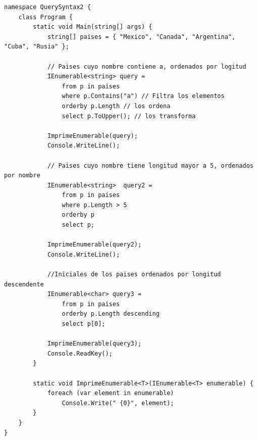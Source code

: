 \documentclass[12pt,a4paper]{report}
\begin{document}
\begin{lstlisting}
namespace QuerySyntax2 {
    class Program {
        static void Main(string[] args) {
            string[] paises = { "Mexico", "Canada", "Argentina", "Cuba", "Rusia" };

            // Paises cuyo nombre contiene a, ordenados por logitud
            IEnumerable<string> query =
                from p in paises
                where p.Contains("a") // Filtra los elementos
                orderby p.Length // los ordena 
                select p.ToUpper(); // los transforma

            ImprimeEnumerable(query);
            Console.WriteLine();

            // Paises cuyo nombre tiene longitud mayor a 5, ordenados por nombre
            IEnumerable<string>  query2 =
                from p in paises
                where p.Length > 5
                orderby p
                select p;

            ImprimeEnumerable(query2);
            Console.WriteLine();

            //Iniciales de los paises ordenados por longitud descendente
            IEnumerable<char> query3 =
                from p in paises
                orderby p.Length descending
                select p[0];

            ImprimeEnumerable(query3);
            Console.ReadKey();
        }

        static void ImprimeEnumerable<T>(IEnumerable<T> enumerable) {
            foreach (var element in enumerable)
                Console.Write(" {0}", element);
        }
    }
}	
\end{lstlisting}
\end{document}
